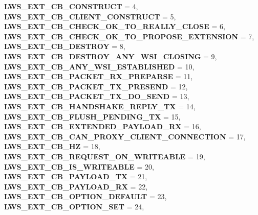 \begin{DoxyCompactItemize}
\newline
{\bfseries L\+W\+S\+\_\+\+E\+X\+T\+\_\+\+C\+B\+\_\+\+C\+O\+N\+S\+T\+R\+U\+CT} = 4, 
{\bfseries L\+W\+S\+\_\+\+E\+X\+T\+\_\+\+C\+B\+\_\+\+C\+L\+I\+E\+N\+T\+\_\+\+C\+O\+N\+S\+T\+R\+U\+CT} = 5, 
{\bfseries L\+W\+S\+\_\+\+E\+X\+T\+\_\+\+C\+B\+\_\+\+C\+H\+E\+C\+K\+\_\+\+O\+K\+\_\+\+T\+O\+\_\+\+R\+E\+A\+L\+L\+Y\+\_\+\+C\+L\+O\+SE} = 6, 
{\bfseries L\+W\+S\+\_\+\+E\+X\+T\+\_\+\+C\+B\+\_\+\+C\+H\+E\+C\+K\+\_\+\+O\+K\+\_\+\+T\+O\+\_\+\+P\+R\+O\+P\+O\+S\+E\+\_\+\+E\+X\+T\+E\+N\+S\+I\+ON} = 7, 
\newline
{\bfseries L\+W\+S\+\_\+\+E\+X\+T\+\_\+\+C\+B\+\_\+\+D\+E\+S\+T\+R\+OY} = 8, 
{\bfseries L\+W\+S\+\_\+\+E\+X\+T\+\_\+\+C\+B\+\_\+\+D\+E\+S\+T\+R\+O\+Y\+\_\+\+A\+N\+Y\+\_\+\+W\+S\+I\+\_\+\+C\+L\+O\+S\+I\+NG} = 9, 
{\bfseries L\+W\+S\+\_\+\+E\+X\+T\+\_\+\+C\+B\+\_\+\+A\+N\+Y\+\_\+\+W\+S\+I\+\_\+\+E\+S\+T\+A\+B\+L\+I\+S\+H\+ED} = 10, 
{\bfseries L\+W\+S\+\_\+\+E\+X\+T\+\_\+\+C\+B\+\_\+\+P\+A\+C\+K\+E\+T\+\_\+\+R\+X\+\_\+\+P\+R\+E\+P\+A\+R\+SE} = 11, 
\newline
{\bfseries L\+W\+S\+\_\+\+E\+X\+T\+\_\+\+C\+B\+\_\+\+P\+A\+C\+K\+E\+T\+\_\+\+T\+X\+\_\+\+P\+R\+E\+S\+E\+ND} = 12, 
{\bfseries L\+W\+S\+\_\+\+E\+X\+T\+\_\+\+C\+B\+\_\+\+P\+A\+C\+K\+E\+T\+\_\+\+T\+X\+\_\+\+D\+O\+\_\+\+S\+E\+ND} = 13, 
{\bfseries L\+W\+S\+\_\+\+E\+X\+T\+\_\+\+C\+B\+\_\+\+H\+A\+N\+D\+S\+H\+A\+K\+E\+\_\+\+R\+E\+P\+L\+Y\+\_\+\+TX} = 14, 
{\bfseries L\+W\+S\+\_\+\+E\+X\+T\+\_\+\+C\+B\+\_\+\+F\+L\+U\+S\+H\+\_\+\+P\+E\+N\+D\+I\+N\+G\+\_\+\+TX} = 15, 
\newline
{\bfseries L\+W\+S\+\_\+\+E\+X\+T\+\_\+\+C\+B\+\_\+\+E\+X\+T\+E\+N\+D\+E\+D\+\_\+\+P\+A\+Y\+L\+O\+A\+D\+\_\+\+RX} = 16, 
{\bfseries L\+W\+S\+\_\+\+E\+X\+T\+\_\+\+C\+B\+\_\+\+C\+A\+N\+\_\+\+P\+R\+O\+X\+Y\+\_\+\+C\+L\+I\+E\+N\+T\+\_\+\+C\+O\+N\+N\+E\+C\+T\+I\+ON} = 17, 
{\bfseries L\+W\+S\+\_\+\+E\+X\+T\+\_\+\+C\+B\+\_\+HZ} = 18, 
{\bfseries L\+W\+S\+\_\+\+E\+X\+T\+\_\+\+C\+B\+\_\+\+R\+E\+Q\+U\+E\+S\+T\+\_\+\+O\+N\+\_\+\+W\+R\+I\+T\+E\+A\+B\+LE} = 19, 
\newline
{\bfseries L\+W\+S\+\_\+\+E\+X\+T\+\_\+\+C\+B\+\_\+\+I\+S\+\_\+\+W\+R\+I\+T\+E\+A\+B\+LE} = 20, 
{\bfseries L\+W\+S\+\_\+\+E\+X\+T\+\_\+\+C\+B\+\_\+\+P\+A\+Y\+L\+O\+A\+D\+\_\+\+TX} = 21, 
{\bfseries L\+W\+S\+\_\+\+E\+X\+T\+\_\+\+C\+B\+\_\+\+P\+A\+Y\+L\+O\+A\+D\+\_\+\+RX} = 22, 
{\bfseries L\+W\+S\+\_\+\+E\+X\+T\+\_\+\+C\+B\+\_\+\+O\+P\+T\+I\+O\+N\+\_\+\+D\+E\+F\+A\+U\+LT} = 23, 
\newline
{\bfseries L\+W\+S\+\_\+\+E\+X\+T\+\_\+\+C\+B\+\_\+\+O\+P\+T\+I\+O\+N\+\_\+\+S\+ET} = 24, 

\end{DoxyCompactItemize}
